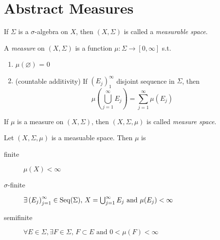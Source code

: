\section{Abstract Measures}

If \(\Sigma\) is a \(\sigma\)-algebra on \(X\), then \((X,\Sigma)\) is called a \emph{measurable space}.

\begin{definition}
    A \emph{measure} on \((X,\Sigma)\) is a function \(\mu:\Sigma \to [0,\infty]\) s.t.
    \begin{enumerate}
        \item \(\mu(\varnothing)\) = 0
        \item (countable additivity) If \(\left( E_j \right)_{1}^{\infty} \) disjoint sequence in \(\Sigma\), then \[\mu(\bigcup_{j=1}^{\infty} E_j) = \sum_{j=1}^{\infty} \mu(E_j) \]
    \end{enumerate}
If \(\mu \) is a measure on \((X,\Sigma)\), then \((X,\Sigma,\mu)\) is called \emph{measure space}.
\end{definition}

\begin{definition}
Let \((X,\Sigma,\mu)\) is a measuable space. Then \(\mu\) is
\begin{description}
    \item[finite] \(\mu(X)<\infty\)
    \item[\(\sigma\)-finite] \(\exists \Seq[E][j] \in \mathrm{Seq}(\Sigma),\, X = \bigcup_{j=1}^{\infty} E_j \mbox{ and } \mu(E_j)< \infty \)
    \item[semifinite] \(\forall E \in \Sigma,\exists F \in \Sigma,\, F \subset E \mbox{ and } 0<\mu(F)<\infty\)
\end{description}
\end{definition}

